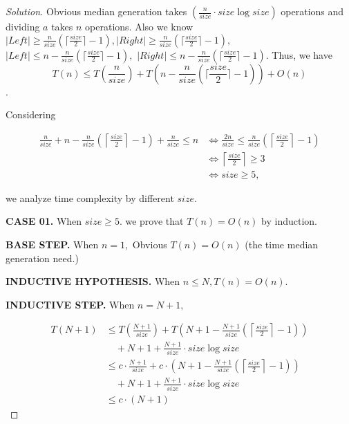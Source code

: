 \documentclass{article}
\newenvironment{solution}{\begin{proof}[\noindent\it Solution]}{\end{proof}}
\begin{document}
\begin{solution}
    \newpage
    
    \hspace{1.3em}
    Obvious median generation takes $\left(\frac{n}{size}\cdot size\log size\right)$ operations and dividing $a$ takes $n$ operations. Also we know $|Left|\geq \frac{n}{size}\left(\lceil \frac{size}{2}\rceil-1\right), |Right|\geq \frac{n}{size}\left(\lceil \frac{size}{2}\rceil-1\right),$ $|Left|\le n- \frac{n}{size}\left(\lceil \frac{size}{2}\rceil-1\right),$ $|Right|\le n-\frac{n}{size}\left(\lceil \frac{size}{2}\rceil-1\right)$. Thus, we have 
    \vspace{0.75em}
    $$T(n) \le T\left(\frac{n}{size}\right)+T\left(n-\frac{n}{size}\left(\lceil \frac{size}{2}\rceil-1\right)\right)+O(n)$$.
    
    \vspace{-2em} \hspace{1.3em}
    Considering
    
    \vspace{-2.5em}
    \begin{align*}
        \frac{n}{size}+n-\frac{n}{size}\left(\left\lceil \frac{size}{2}\right\rceil-1\right)+\frac{n}{size}\le n &\Longleftrightarrow \frac{2n}{size}\le\frac{n}{size}\left(\left\lceil \frac{size}{2}\right\rceil-1\right) \\
        &\Longleftrightarrow\left\lceil \frac{size}{2}\right\rceil\geq 3 \\
        &\Longleftrightarrow size\geq 5,
    \end{align*}

    \vspace{-1em} \hspace{1.3em}
    we analyze time complexity by different $size$.
    
    \hspace{1.3em}
    \textbf{CASE 01.} When $size\geq 5$. we prove that $T(n)=O(n)$ by induction.
    
    \hspace{3.9em} \textbf{BASE STEP.} When $n=1,$ Obvious $T(n)=O(n)$ (the time median generation need.)
    
    \hspace{3.9em} \textbf{INDUCTIVE HYPOTHESIS.} When $n\le N, T(n)=O(n).$
    
    \hspace{3.9em} \textbf{INDUCTIVE STEP.}
    When $n=N+1,$
    
    \vspace{-2.5em}
    \begin{align*}
    T(N+1) &\le T\left(\frac{N+1}{size}\right)+T\left(N+1-\frac{N+1}{size}\left(\left\lceil\frac{size}{2}\right\rceil-1\right)\right)\\
    &\quad+N+1+\frac{N+1}{size}\cdot size\log size\\
    &\le c\cdot\frac{N+1}{size}+c\cdot\left(N+1-\frac{N+1}{size}\left(\left\lceil\frac{size}{2}\right\rceil-1\right)\right)\\
    &\quad+N+1+\frac{N+1}{size}\cdot size\log size \\
    &\le c\cdot(N+1)
    \end{align*}
    

\end{solution}
\end{document}
